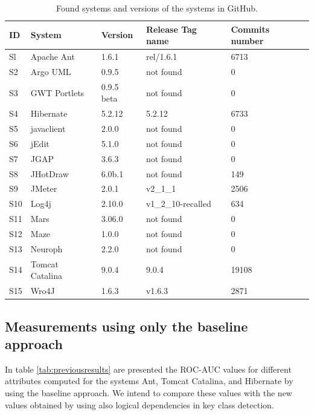 \documentclass[runningheads]{comsis2}
\begin{document}
\begin{table}
\renewcommand{\arraystretch}{1}
\caption{Found systems and versions of the systems in GitHub. }
\label{tab:gitfoundsystems}
\centering
\begin{tabular}{lllll}
\hline
ID	&	System	&	Version	&	Release Tag name	&	Commits number	\\
\hline
Sl	&	Apache Ant	&	1.6.1	&	rel/1.6.1	&	6713	\\
S2	&	Argo UML	&	0.9.5	&	not found	&	0	\\
S3	&	GWT Portlets	&	0.9.5 beta	&	not found	&	0	\\
S4	&	Hibernate 	&	5.2.12	&	5.2.12	&	6733	\\
S5	&	javaclient	&	2.0.0	&	not found	&	0	\\
S6	&	jEdit	&	5.1.0	&	not found	&	0	\\
S7	&	JGAP	&	3.6.3	&	not found	&	0	\\
S8	&	JHotDraw	&	6.0b.1	&	not found	&	149	\\
S9	&	JMeter	&	2.0.1	&	v2\_1\_1	&	2506	\\
S10	&	Log4j	&	2.10.0	&	v1\_2\_10-recalled	&	634	\\
S11	&	Mars	&	3.06.0	&	not found	&	0	\\
S12	&	Maze	&	1.0.0	&	not found	&	0	\\
S13	&	Neuroph	&	2.2.0	&	not found	&	0	\\
S14	&	Tomcat Catalina	&	9.0.4	&	9.0.4	&	19108	\\
S15	&	Wro4J	&	1.6.3	&	v1.6.3	&	2871	\\
\hline
\end{tabular}
\end{table}





\subsection{Measurements using only the baseline approach}


In table \ref{tab:previousresults} are presented the ROC-AUC values for different attributes computed for the systems Ant, Tomcat Catalina, and Hibernate by using the baseline approach. We intend to compare these values with the new values obtained by using also logical dependencies in key class detection.
\end{document}
